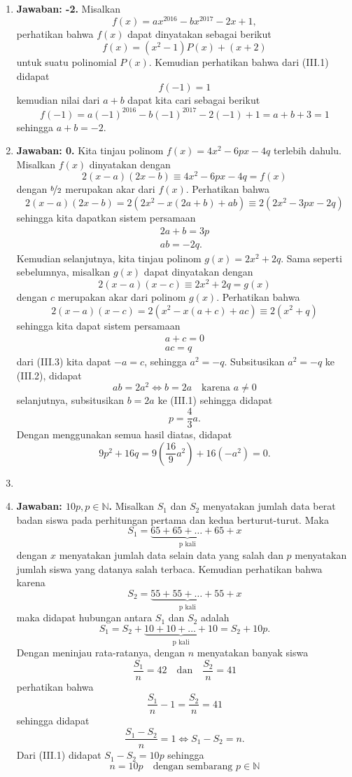 \begin{enumerate}
\item \textbf{Jawaban: -2.} Misalkan $$f(x) = ax^{2016} - bx^{2017} - 2x + 1,$$perhatikan bahwa $f(x)$ dapat dinyatakan sebagai berikut \setcounter{equation}{0}\begin{equation}f(x) = (x^2-1)P(x) + (x+2)\end{equation} untuk suatu polinomial $P(x)$. Kemudian perhatikan bahwa dari (III.1) didapat $$f(-1) = 1$$kemudian nilai dari $a+b$ dapat kita cari sebagai berikut $$f(-1) = a(-1)^{2016} - b(-1)^{2017} - 2(-1) +1 = a+b +3 = 1$$sehingga $a+b = -2.$

\item \textbf{Jawaban: 0.} Kita tinjau polinom $f(x) = 4x^2-6px -4q$ terlebih dahulu. Misalkan $f(x)$ dinyatakan dengan $$2(x-a)(2x-b) \equiv 4x^2-6px - 4q = f(x)$$dengan $\nicefrac{b}{2}$ merupakan akar dari $f(x)$. Perhatikan bahwa $$2(x-a)(2x-b) = 2(2x^2-x(2a+b)+ab)\equiv 2(2x^2-3px-2q)$$sehingga kita dapatkan sistem persamaan
	\setcounter{equation}{0}\begin{gather}
	2a + b = 3p\\
	ab = -2q.
	\end{gather}
Kemudian selanjutnya, kita tinjau polinom $g(x) = 2x^2+2q$. Sama seperti sebelumnya, misalkan $g(x)$ dapat dinyatakan dengan $$2(x-a)(x-c) \equiv 2x^2+2q = g(x)$$ dengan $c$ merupakan akar dari polinom $g(x)$. Perhatikan bahwa $$2(x-a)(x-c) = 2(x^2-x(a+c)+ac) \equiv 2(x^2+q)$$ sehingga kita dapat sistem persamaan
	\begin{gather}
	a+c = 0\\
	ac = q
	\end{gather}
dari (III.3) kita dapat $-a = c$, sehingga $a^2 = -q$. Subsitusikan $a^2=-q$ ke (III.2), didapat $$ab = 2a^2\Leftrightarrow b = 2a\quad\text{karena $a\neq 0$}$$selanjutnya, subsitusikan $b = 2a$ ke (III.1) sehingga didapat $$p = \frac{4}{3}a.$$Dengan menggunakan semua hasil diatas, didapat $$9p^2 + 16q = 9\left(\frac{16}{9}a^2\right) + 16(-a^2) = 0.$$

\item

\item \textbf{Jawaban: $10p, p\in\mathbb{N}$.} Misalkan $S_1$ dan $S_2$ menyatakan jumlah data berat badan siswa pada perhitungan pertama dan kedua berturut-turut. Maka $$S_1 = \underbrace{65+65+\ldots+65}_{\text{p kali}} + x$$dengan $x$ menyatakan jumlah data selain data yang salah dan $p$ menyatakan jumlah siswa yang datanya salah terbaca. Kemudian perhatikan bahwa karena $$S_2 = \underbrace{55+55+\ldots+55}_{\text{p kali}} + x$$maka didapat hubungan antara $S_1$ dan $S_2$ adalah \setcounter{equation}{0}\begin{equation}S_1 = S_2 + \underbrace{10+10+\ldots+10}_{\text{p kali}} = S_2 + 10p.\end{equation}Dengan meninjau rata-ratanya, dengan $n$ menyatakan banyak siswa $$\frac{S_1}{n} = 42\quad\text{dan}\quad\frac{S_2}{n} = 41$$perhatikan bahwa $$\frac{S_1}{n} - 1 = \frac{S_2}{n} = 41$$sehingga didapat $$\frac{S_1 - S_2}{n} = 1\Leftrightarrow S_1 - S_2 = n.$$ Dari (III.1) didapat $S_1 - S_2 = 10p$ sehingga $$n = 10p\quad\text{dengan sembarang $p\in\mathbb{N}$}$$


\end{enumerate}
